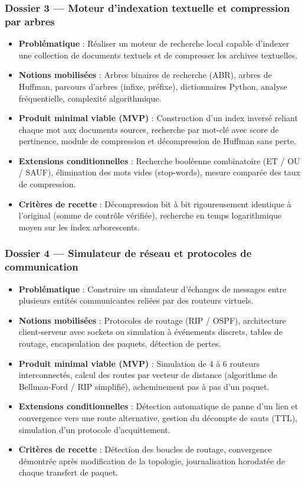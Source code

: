 \subsubsection*{Dossier 3 — Moteur d'indexation textuelle et compression par arbres}
\begin{itemize}
  \item \textbf{Problématique} : Réaliser un moteur de recherche local capable d'indexer une collection de documents textuels et de compresser les archives textuelles.
  \item \textbf{Notions mobilisées} : Arbres binaires de recherche (ABR), arbres de Huffman, parcours d'arbres (infixe, préfixe), dictionnaires Python, analyse fréquentielle, complexité algorithmique.
  \item \textbf{Produit minimal viable (MVP)} : Construction d'un index inversé reliant chaque mot aux documents sources, recherche par mot-clé avec score de pertinence, module de compression et décompression de Huffman sans perte.
  \item \textbf{Extensions conditionnelles} : Recherche booléenne combinatoire (ET / OU / SAUF), élimination des mots vides (stop-words), mesure comparée des taux de compression.
  \item \textbf{Critères de recette} : Décompression bit à bit rigoureusement identique à l'original (somme de contrôle vérifiée), recherche en temps logarithmique moyen sur les index arborescents.
\end{itemize}

\subsubsection*{Dossier 4 — Simulateur de réseau et protocoles de communication}
\begin{itemize}
  \item \textbf{Problématique} : Construire un simulateur d'échanges de messages entre plusieurs entités communicantes reliées par des routeurs virtuels.
  \item \textbf{Notions mobilisées} : Protocoles de routage (RIP / OSPF), architecture client-serveur avec sockets ou simulation à événements discrets, tables de routage, encapsulation des paquets, détection de pertes.
  \item \textbf{Produit minimal viable (MVP)} : Simulation de 4 à 6 routeurs interconnectés, calcul des routes par vecteur de distance (algorithme de Bellman-Ford / RIP simplifié), acheminement pas à pas d'un paquet.
  \item \textbf{Extensions conditionnelles} : Détection automatique de panne d'un lien et convergence vers une route alternative, gestion du décompte de sauts (TTL), simulation d'un protocole d'acquittement.
  \item \textbf{Critères de recette} : Détection des boucles de routage, convergence démontrée après modification de la topologie, journalisation horodatée de chaque transfert de paquet.
\end{itemize}

